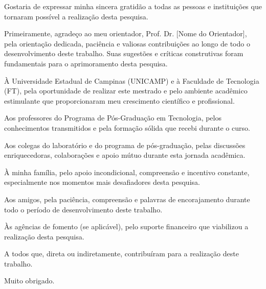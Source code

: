
Gostaria de expressar minha sincera gratidão a todas as pessoas e instituições que tornaram possível a realização desta pesquisa.

Primeiramente, agradeço ao meu orientador, Prof. Dr. [Nome do Orientador], pela orientação dedicada, paciência e valiosas contribuições ao longo de todo o desenvolvimento deste trabalho. Suas sugestões e críticas construtivas foram fundamentais para o aprimoramento desta pesquisa.

À Universidade Estadual de Campinas (UNICAMP) e à Faculdade de Tecnologia (FT), pela oportunidade de realizar este mestrado e pelo ambiente acadêmico estimulante que proporcionaram meu crescimento científico e profissional.

Aos professores do Programa de Pós-Graduação em Tecnologia, pelos conhecimentos transmitidos e pela formação sólida que recebi durante o curso.

Aos colegas do laboratório e do programa de pós-graduação, pelas discussões enriquecedoras, colaborações e apoio mútuo durante esta jornada acadêmica.

À minha família, pelo apoio incondicional, compreensão e incentivo constante, especialmente nos momentos mais desafiadores desta pesquisa.

Aos amigos, pela paciência, compreensão e palavras de encorajamento durante todo o período de desenvolvimento deste trabalho.

Às agências de fomento (se aplicável), pelo suporte financeiro que viabilizou a realização desta pesquisa.

A todos que, direta ou indiretamente, contribuíram para a realização deste trabalho.

Muito obrigado.